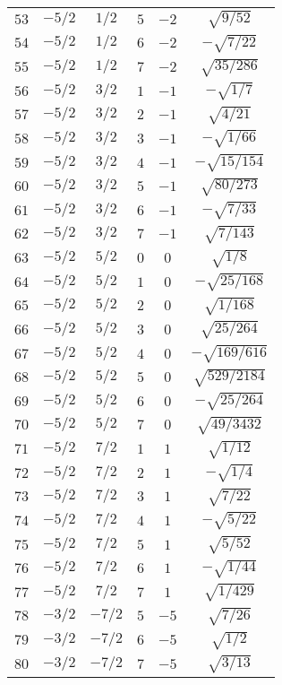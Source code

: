 \begin{table}
\begin{center}
\begin{tabular}{|c|c|c|c|c|c|}
$53$ & $-5/2$ & $1/2$ & $5$ & $-2$ & $\sqrt{9/52}$ \\ 
$54$ & $-5/2$ & $1/2$ & $6$ & $-2$ & $-\sqrt{7/22}$ \\ 
$55$ & $-5/2$ & $1/2$ & $7$ & $-2$ & $\sqrt{35/286}$ \\ 
$56$ & $-5/2$ & $3/2$ & $1$ & $-1$ & $-\sqrt{1/7}$ \\ 
$57$ & $-5/2$ & $3/2$ & $2$ & $-1$ & $\sqrt{4/21}$ \\ 
$58$ & $-5/2$ & $3/2$ & $3$ & $-1$ & $-\sqrt{1/66}$ \\ 
$59$ & $-5/2$ & $3/2$ & $4$ & $-1$ & $-\sqrt{15/154}$ \\ 
$60$ & $-5/2$ & $3/2$ & $5$ & $-1$ & $\sqrt{80/273}$ \\ 
$61$ & $-5/2$ & $3/2$ & $6$ & $-1$ & $-\sqrt{7/33}$ \\ 
$62$ & $-5/2$ & $3/2$ & $7$ & $-1$ & $\sqrt{7/143}$ \\ 
$63$ & $-5/2$ & $5/2$ & $0$ & $0$ & $\sqrt{1/8}$ \\ 
$64$ & $-5/2$ & $5/2$ & $1$ & $0$ & $-\sqrt{25/168}$ \\ 
$65$ & $-5/2$ & $5/2$ & $2$ & $0$ & $\sqrt{1/168}$ \\ 
$66$ & $-5/2$ & $5/2$ & $3$ & $0$ & $\sqrt{25/264}$ \\ 
$67$ & $-5/2$ & $5/2$ & $4$ & $0$ & $-\sqrt{169/616}$ \\ 
$68$ & $-5/2$ & $5/2$ & $5$ & $0$ & $\sqrt{529/2184}$ \\ 
$69$ & $-5/2$ & $5/2$ & $6$ & $0$ & $-\sqrt{25/264}$ \\ 
$70$ & $-5/2$ & $5/2$ & $7$ & $0$ & $\sqrt{49/3432}$ \\ 
$71$ & $-5/2$ & $7/2$ & $1$ & $1$ & $\sqrt{1/12}$ \\ 
$72$ & $-5/2$ & $7/2$ & $2$ & $1$ & $-\sqrt{1/4}$ \\ 
$73$ & $-5/2$ & $7/2$ & $3$ & $1$ & $\sqrt{7/22}$ \\ 
$74$ & $-5/2$ & $7/2$ & $4$ & $1$ & $-\sqrt{5/22}$ \\ 
$75$ & $-5/2$ & $7/2$ & $5$ & $1$ & $\sqrt{5/52}$ \\ 
$76$ & $-5/2$ & $7/2$ & $6$ & $1$ & $-\sqrt{1/44}$ \\ 
$77$ & $-5/2$ & $7/2$ & $7$ & $1$ & $\sqrt{1/429}$ \\ 
$78$ & $-3/2$ & $-7/2$ & $5$ & $-5$ & $\sqrt{7/26}$ \\ 
$79$ & $-3/2$ & $-7/2$ & $6$ & $-5$ & $\sqrt{1/2}$ \\ 
$80$ & $-3/2$ & $-7/2$ & $7$ & $-5$ & $\sqrt{3/13}$ \\ 

\end{tabular}
\end{center}
\end{table}
